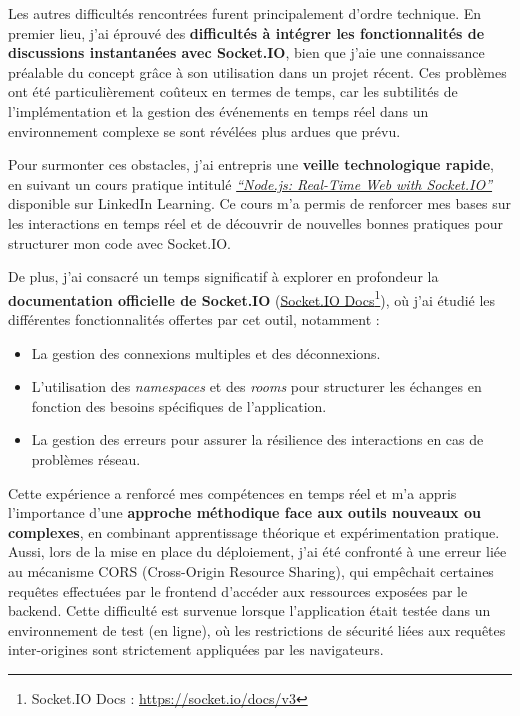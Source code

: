 {Les autres difficultés rencontrées furent principalement d'ordre technique. En premier lieu, j'ai éprouvé des \textbf{difficultés à intégrer les fonctionnalités de discussions instantanées avec Socket.IO}, bien que j’aie une connaissance préalable du concept grâce à son utilisation dans un projet récent. Ces problèmes ont été particulièrement coûteux en termes de temps, car les subtilités de l'implémentation et la gestion des événements en temps réel dans un environnement complexe se sont révélées plus ardues que prévu.

Pour surmonter ces obstacles, j'ai entrepris une \textbf{veille technologique rapide}, en suivant un cours pratique intitulé \textit{\href{https://www.linkedin.com/learning/node-js-real-time-web-with-socket-io}{``Node.js: Real-Time Web with Socket.IO''}} disponible sur LinkedIn Learning. Ce cours m’a permis de renforcer mes bases sur les interactions en temps réel et de découvrir de nouvelles bonnes pratiques pour structurer mon code avec Socket.IO.

De plus, j’ai consacré un temps significatif à explorer en profondeur la \textbf{documentation officielle de Socket.IO} (\href{https://socket.io/docs/v3}{Socket.IO Docs}\footnote{Socket.IO Docs : \href{https://socket.io/docs/v3}{https://socket.io/docs/v3}}), où j’ai étudié les différentes fonctionnalités offertes par cet outil, notamment :  
\begin{itemize}
    \item La gestion des connexions multiples et des déconnexions.
    \item L’utilisation des \textit{namespaces} et des \textit{rooms} pour structurer les échanges en fonction des besoins spécifiques de l’application.
    \item La gestion des erreurs pour assurer la résilience des interactions en cas de problèmes réseau.
\end{itemize}

Cette expérience a renforcé mes compétences en temps réel et m’a appris l’importance d’une \textbf{approche méthodique face aux outils nouveaux ou complexes}, en combinant apprentissage théorique et expérimentation pratique. \\

Aussi, lors de la mise en place du déploiement, j'ai été confronté à une erreur liée au mécanisme CORS (Cross-Origin Resource Sharing), qui empêchait certaines requêtes effectuées par le frontend d’accéder aux ressources exposées par le backend. Cette difficulté est survenue lorsque l’application était testée dans un environnement de test (en ligne), où les restrictions de sécurité liées aux requêtes inter-origines sont strictement appliquées par les navigateurs.\\

}

